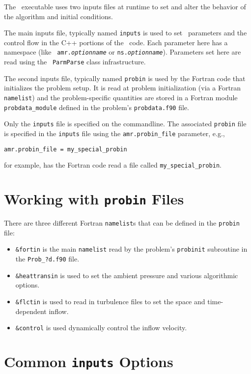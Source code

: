 The \pelelm\ executable uses two inputs files at runtime to set and alter the
behavior of the algorithm and initial conditions.

The main inputs file, typically named {\tt inputs} is used to
set \amrex\ parameters and the control flow in the C++ portions of
the \pelelm\ code.  Each parameter here has a namespace (like {\tt
amr.{\em optionname}} or {\tt ns.{\em optionname}}).  Parameters
set here are read using the \amrex\ {\tt ParmParse} class
infrastructure.

The second inputs file, typically named {\tt probin} is used by the
Fortran code that initializes the problem setup.  It is read at
problem initialization (via a Fortran {\tt namelist}) and the
problem-specific quantities are stored in a Fortran module {\tt
probdata\_module} defined in the problem's {\tt probdata.f90} file.

Only the {\tt inputs} file is specified on the commandline.  The
associated {\tt probin} file is specified in the {\tt inputs} file
using the {\tt amr.probin\_file} parameter, e.g.,
\begin{lstlisting}
amr.probin_file = my_special_probin
\end{lstlisting}
for example, has the Fortran code read a file called {\tt my\_special\_probin}.

\section{Working with {\tt probin} Files}

There are three different Fortran {\tt namelist}s that can be defined in the
{\tt probin} file:
\begin{itemize}
\item {\tt \&fortin} is the main {\tt namelist} read by the problem's {\tt probinit}
subroutine in the {\tt Prob\_?d.f90} file.

\item {\tt \&heattransin} is used to set the ambient pressure and various algorithmic options.

\item {\tt \&flctin} is used to read in turbulence files to set the space and
time-dependent inflow.

\item {\tt \&control} is used dynamically control the inflow velocity.
\end{itemize}

\section{Common {\tt inputs} Options}

